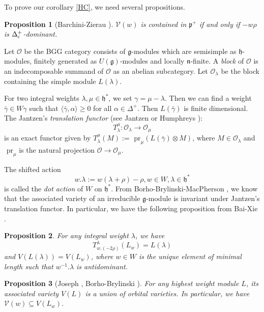 \documentclass{amsart}[12pt]
\newtheorem{Pro}{Proposition}[section]
\numberwithin{equation}{section}
\begin{document}
To prove our corollary \ref{HC}, we need several propositions.

\begin{Pro}[Barchini-Zierau \cite{BZ16}]\label{BZ}
	$\mathcal{V}(w)$ is  contained in $\mathfrak{p}^+$ if and only if $-w\rho$ is $\Delta_{\rm{c}}^+$-dominant.
\end{Pro}



Let  $ \mathcal{O} $ be the BGG category consists of $ \mathfrak{g} $-modules which are  semisimple as $ \mathfrak{h} $-modules, finitely generated as $ U(\mathfrak{g}) $-modules and locally $ \mathfrak{n} $-finite. A \textit{block} of $ \mathcal{O} $ is an indecomposable summand of $ \mathcal{O} $ as an abelian subcategory. Let $ \mathcal{O} _\lambda $  be the block containing  the simple module $ L(\lambda) $.


For two integral weights $ \lambda,\mu \in \mathfrak{h}^*$, we set $ \gamma=\mu-\lambda $. Then we can find a weight $ \bar{\gamma} \in W\gamma$ such that $ \langle {\bar{\gamma}},{\alpha} \rangle \geq 0$ for all $ \alpha \in\Delta^+$. Then $ L(\bar{\gamma}) $ is finite dimensional. The Jantzen's \textit{translation functor} (see Jantzen \cite{Ja79} or Humphreys \cite{Hum}): $$  T_\lambda^\mu : \mathcal{O}_\lambda \rightarrow \mathcal{O}_\mu $$ is   an exact functor given by $ T_\lambda^\mu(M):=\text{ pr}_\mu (L(\bar{\gamma})\otimes M) $, where $ M\in   \mathcal{O}_\lambda $ and $ \text{ pr}_\mu $ is the natural projection $ \mathcal{O} \rightarrow \mathcal{O}_\mu $.


The shifted action \[
w.\lambda:=w(\lambda+\rho)-\rho, w\in W,\lambda\in \mathfrak{h}^*
\] is called the \textit{dot action} of $ W $ on $\mathfrak{h}^* $.
From Borho-Brylinski-MacPherson \cite[Lemma 5.2]{BBM}, we know that the associated variety of an irreducible $\mathfrak{g}$-module is invariant under Jantzen's translation functor. In particular, we have the following proposition from Bai-Xie \cite[Corollary 3.3]{BX}.


\begin{Pro}\label{l3.3}
	For any integral weight $\lambda$, we have
	\[
	T_{w.(-2\rho)}^\lambda (L_w)=L(\lambda)
	\]
	and $V(L(\lambda))=V(L_w)$, where $ w\in W $ is the unique element of minimal length such that $ w^{-1}.\lambda $ is antidominant.
\end{Pro}

\begin{Pro}[Joseph \cite{Jo84},  Borho-Brylinski \cite{BoB3}]\label{p3.3}
	For any highest weight module $L$, its associated variety $V(L)$ is a union of orbital varieties. In particular, we have $\mathcal{V}(w)\subseteq  V(L_w)$.
\end{Pro}
\end{document}
